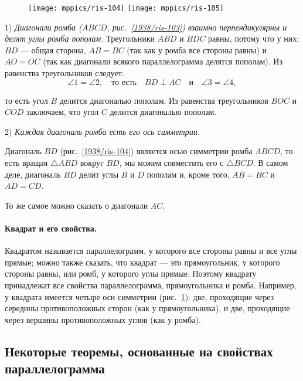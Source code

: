 \documentclass[oneside]{book}
\begin{document}
\begin{figure}
\centering
\texttt{[image: mppics/ris-104]}
\label{1938/ris-104}
\bigskip
\texttt{[image: mppics/ris-105]}
\caption{}\label{1938/ris-105}
\end{figure}

1) \emph{Диагонали ромба \emph{($ABCD$, рис.~\ref{1938/ris-103})} взаимно перпендикулярны и делят углы ромба пополам.}
Треугольники $ABD$ и $BDC$ равны, потому что у них:
$BD$ — общая сторона, $AB=BC$ (так как у ромба все стороны равны) и $AO=OC$ (так как диагонали всякого параллелограмма делятся пополам).
Из равенства треугольников следует:
\[\angle 1 =\angle 2,
\quad
\text{то есть}
\quad
BD\perp AC
\quad
\text{и}
\quad
\angle 3 =\angle 4,
\]

\noindent
то есть угол $B$ делится диагональю пополам.
Из равенства треугольников $BOC$ и $COD$ заключаем, что угол $C$ делится диагональю пополам.

2) \emph{Каждая диагональ ромба есть его ось симметрии.}

Диагональ $BD$ (рис.~\ref{1938/ris-104}) является осью симметрии ромба $ABCD$,
то есть вращая $\triangle ABD$ вокруг $BD$, мы можем совместить его с $\triangle BCD$.
В самом деле, диагональ $BD$ делит углы $B$ и $D$ пополам и, кроме того, $AB=BC$ и $AD=CD$.

То же самое можно сказать о диагонали $AC$.

\paragraph{Квадрат и его свойства.}\label{1938/94}
Квадратом называется параллелограмм, у которого все стороны равны и все углы прямые;
можно также сказать, что квадрат — это прямоугольник, у которого стороны равны, или ромб, у которого углы прямые.
Поэтому квадрату принадлежат все свойства параллелограмма, прямоугольника и ромба.
Например, у квадрата имеется четыре оси симметрии (рис.~\ref{1938/ris-105}):
две, проходящие через середины противоположных сторон (как у прямоугольника), и две, проходящие через вершины противоположных углов (как у ромба).

\subsection*{Некоторые теоремы, основанные на свойствах параллелограмма}
\end{document}
